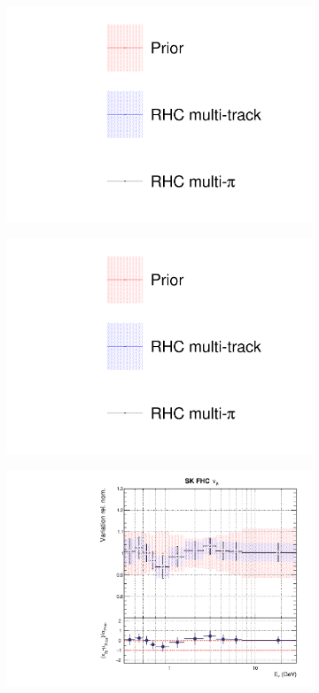 \begin{figure}[t]
\centering
\begin{subfigure}{0.3\textwidth}
  \centering
  \includegraphics[width=1.0\linewidth, trim={5mm  130mm 0mm 10mm}, clip]{figs/rhcmpdat248_leg}	
\end{subfigure}
\begin{subfigure}{0.3\textwidth}
  \centering
  \includegraphics[width=1.0\linewidth, trim={5mm  0mm 0mm 70mm}, clip]{figs/rhcmpdat248_leg}	
\end{subfigure}
\begin{subfigure}{0.42\textwidth}
  \centering
  \includegraphics[width=0.75\linewidth]{figs/rhcmpdat248flux_8}

\end{subfigure}
\end{figure}
